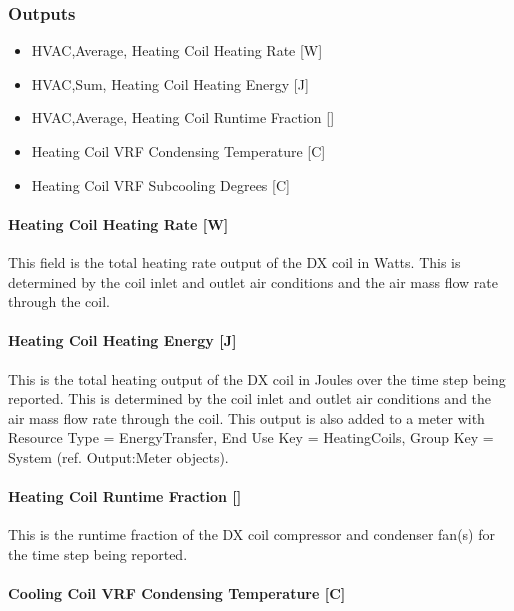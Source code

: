 \subsubsection{Outputs}\label{outputs-8-002}

\begin{itemize}
\item
  HVAC,Average, Heating Coil Heating Rate {[}W{]}
\item
  HVAC,Sum, Heating Coil Heating Energy {[}J{]}
\item
  HVAC,Average, Heating Coil Runtime Fraction {[]}
\item
  Heating Coil VRF Condensing Temperature {[}C{]}
\item
  Heating Coil VRF Subcooling Degrees {[}C{]}
\end{itemize}

\paragraph{Heating Coil Heating Rate {[}W{]}}\label{heating-coil-heating-rate-w-5}

This field is the total heating rate output of the DX coil in Watts. This is determined by the coil inlet and outlet air conditions and the air mass flow rate through the coil.

\paragraph{Heating Coil Heating Energy {[}J{]}}\label{heating-coil-heating-energy-j-5}

This is the total heating output of the DX coil in Joules over the time step being reported. This is determined by the coil inlet and outlet air conditions and the air mass flow rate through the coil. This output is also added to a meter with Resource Type = EnergyTransfer, End Use Key = HeatingCoils, Group Key = System (ref. Output:Meter objects).

\paragraph{Heating Coil Runtime Fraction {[]}}\label{heating-coil-runtime-fraction-2}

This is the runtime fraction of the DX coil compressor and condenser fan(s) for the time step being reported.

\paragraph{Cooling Coil VRF Condensing Temperature {[}C{]}}\label{cooling-coil-vrf-condensing-temperature-c}

